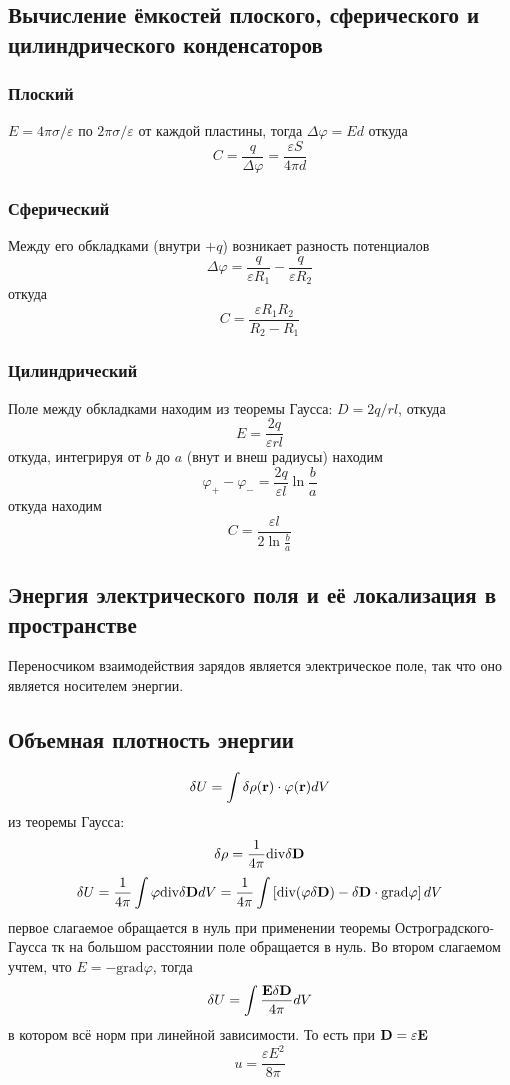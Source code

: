 \documentclass[a4paper,12pt]{article} %
\begin{document}
\subsection{Вычисление ёмкостей плоского, сферического и цилиндрического конденсаторов}
\subsubsection{Плоский}
$E = 4 \pi \sigma / \varepsilon$ по $2 \pi \sigma / \varepsilon$ от каждой пластины, тогда $\Delta \varphi = Ed$ откуда 
\begin{equation}
	C = \frac{q}{\Delta \varphi} = \frac{\varepsilon S}{4 \pi d}
\end{equation}
\subsubsection{Сферический}
Между его обкладками (внутри $+q$) возникает разность потенциалов $$\Delta \varphi = \frac{q}{\varepsilon R_1} - \frac{q}{\varepsilon R_2}$$ откуда $$ C = \frac{\varepsilon R_1 R_2}{R_2 - R_1}$$
\subsubsection{Цилиндрический}
Поле между обкладками находим из теоремы Гаусса:
$D = 2q / rl$, откуда $$E = \frac{2q}{\varepsilon r l}$$
откуда, интегрируя от $b$ до $a$ (внут и внеш радиусы) находим $$\varphi_+ - \varphi_- = \frac{2 q}{\varepsilon l} \ln \frac{b}{a}$$
откуда находим 
\begin{equation}
	C = \frac{\varepsilon l}{2 \ln \frac{b}{a}}
\end{equation}
\subsection{Энергия электрического поля и её локализация в пространстве}
Переносчиком взаимодействия зарядов является электрическое поле, так что оно является носителем энергии.
\subsection{Объемная плотность энергии}
$$ \delta U = \int \delta \rho ({\bf r}) \cdot \varphi({\bf r}) d V$$
из теоремы Гаусса:
$$ \delta \rho = \frac{1}{4 \pi} \text{div} \delta {\bf D}$$
$$ \delta U =  \frac{1}{4 \pi} \int  \varphi  \text{div} \delta {\bf D} d V = \frac{1}{4 \pi} \int \left[ \text{div} (\varphi \delta {\bf D}) - \delta {\bf D} \cdot \text{grad} \varphi \right] d V$$
первое слагаемое обращается в нуль при применении теоремы Остроградского-Гаусса тк на большом расстоянии поле обращается в нуль. Во втором слагаемом учтем, что $E = - \text{grad} \varphi$, тогда
$$\delta U = \int \frac{{\bf E} \delta {\bf D}}{4 \pi} d V$$
в котором всё норм при линейной зависимости. То есть при ${\bf D} = \varepsilon {\bf E}$ 
$$u = \frac{\varepsilon E^2}{8 \pi}$$
\end{document}
